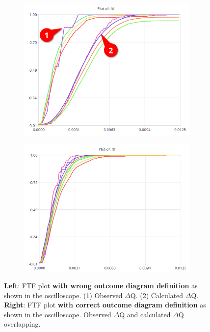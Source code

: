             \begin{figure}[H]
                \centering
                \begin{subfigure}{.5\textwidth}
                    \centering
                    \includegraphics[width =0.98\textwidth]{img/bad1.png}
                    \label{fig:bad}
                \end{subfigure}%
                \begin{subfigure}{.5\textwidth}%
                    \centering%
                    \includegraphics[width =0.98\textwidth]{img/good.png}%
                    \label{fig:good}%
                \end{subfigure}%
                \caption{\textbf{Left}: FTF plot \textbf{with wrong outcome diagram definition} as shown in the oscilloscope. (1) Observed $\Delta$Q. (2) Calculated $\Delta$Q. \\
                \textbf{Right}: FTF plot \textbf{with correct outcome diagram definition} as shown in the oscilloscope. Observed $\Delta$Q and calculated $\Delta$Q overlapping.}
                \label{fig:ftf_osc}%
            \end{figure}%
